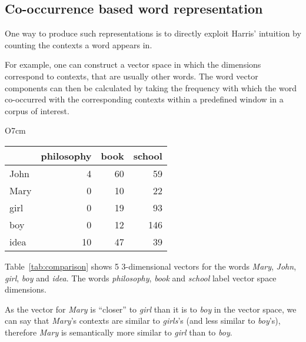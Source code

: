\subsection{Co-occurrence based word representation}
\label{sec:distr-repr}

One way to produce such representations is to directly exploit Harris' \citeyearpar{harris1954distributional} intuition by counting the contexts a word appears in.


For example, one can construct a vector space in which the dimensions correspond to contexts, that are usually other words. The word vector components can then be calculated by taking the frequency with which the word co-occurred with the corresponding contexts within a predefined window in a corpus of interest.

\begin{wraptable}[10]{O}{7cm}
  \centering
  \begin{tabular}{lrrr}
    \toprule
    & philosophy & book & school \\
    \midrule
    John & 4  & 60 & 59  \\
    Mary & 0  & 10 & 22  \\
    girl & 0  & 19 & 93  \\
    boy  & 0  & 12 & 146 \\
    idea & 10 & 47 & 39  \\
    \bottomrule
  \end{tabular}
  \caption{Word co-occurrence frequencies extracted from the BNC.}
  \label{tab:comparison}
\end{wraptable}

Table~\ref{tab:comparison} shows 5 3-dimensional vectors for the words \textit{Mary}, \textit{John}, \textit{girl}, \textit{boy} and \textit{idea}. The words \textit{philosophy}, \textit{book} and \textit{school} label vector space dimensions.

As the vector for \textit{Mary} is ``closer'' to \textit{girl} than it is to \textit{boy} in the vector space, we can say that \textit{Mary}'s contexts are similar to \textit{girls}'s (and less similar to \textit{boy}'s), therefore \textit{Mary} is semantically more similar to \textit{girl} than to \textit{boy}.

